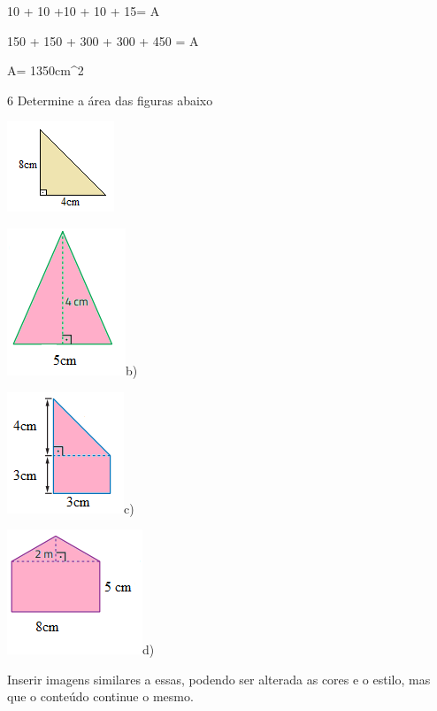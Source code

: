 10 + 10 +10 + 10 + 15= A

150 + 150 + 300 + 300 + 450 = A

A= 1350cm^2

\num{6} Determine a área das figuras abaixo

\item 

\includegraphics[width=1\times 26042in,height=1\times 0625in]{./imgSAEB_8_MAT/media/image46.png}

\includegraphics[width=1\times 39583in,height=1\times 72917in]{./imgSAEB_8_MAT/media/image47.png}b)

\includegraphics[width=1\times 375in,height=1\times 42708in]{./imgSAEB_8_MAT/media/image48.png}c)

\includegraphics[width=1\times 59375in,height=1\times 46875in]{./imgSAEB_8_MAT/media/image49.png}d)

Inserir imagens similares a essas, podendo ser alterada as cores e o
estilo, mas que o conteúdo continue o mesmo.

